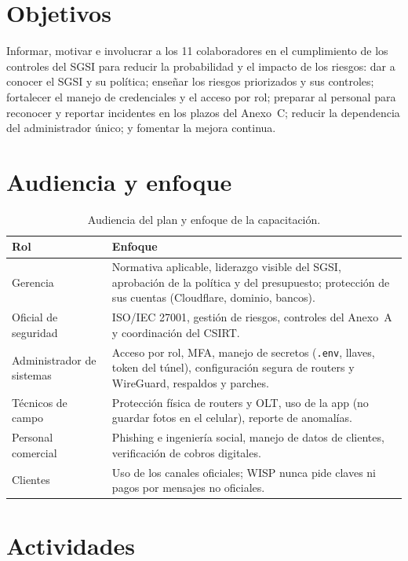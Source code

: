 \section{Objetivos}
Informar, motivar e involucrar a los 11 colaboradores en el cumplimiento de los controles del
SGSI para reducir la probabilidad y el impacto de los riesgos: dar a conocer el SGSI y su
política; enseñar los riesgos priorizados y sus controles; fortalecer el manejo de
credenciales y el acceso por rol; preparar al personal para reconocer y reportar incidentes
en los plazos del Anexo~C; reducir la dependencia del administrador único; y fomentar la
mejora continua.

\section{Audiencia y enfoque}

\begin{table}[H]
\centering
\caption{Audiencia del plan y enfoque de la capacitación.}
\label{tab:anx-conc-audiencia}
\small
\begin{tabularx}{\textwidth}{L{3.2cm}X}
\toprule
\textbf{Rol} & \textbf{Enfoque} \\
\midrule
Gerencia & Normativa aplicable, liderazgo visible del SGSI, aprobación de la política y del presupuesto; protección de sus cuentas (Cloudflare, dominio, bancos). \\
Oficial de seguridad & ISO/IEC 27001, gestión de riesgos, controles del Anexo~A y coordinación del CSIRT. \\
Administrador de sistemas & Acceso por rol, MFA, manejo de secretos (\texttt{.env}, llaves, token del túnel), configuración segura de routers y WireGuard, respaldos y parches. \\
Técnicos de campo & Protección física de routers y OLT, uso de la app (no guardar fotos en el celular), reporte de anomalías. \\
Personal comercial & Phishing e ingeniería social, manejo de datos de clientes, verificación de cobros digitales. \\
Clientes & Uso de los canales oficiales; WISP nunca pide claves ni pagos por mensajes no oficiales. \\
\bottomrule
\end{tabularx}
\end{table}

\section{Actividades}


